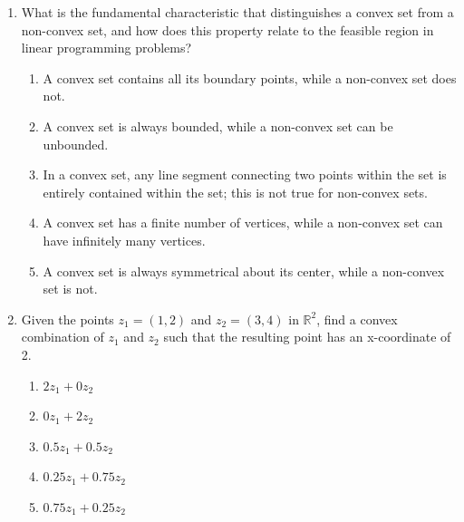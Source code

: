 \documentclass{article}%
\begin{document}
\begin{enumerate}
\vspace{1em}%
\item What is the fundamental characteristic that distinguishes a convex set from a non-convex set, and how does this property relate to the feasible region in linear programming problems?%
\begin{enumerate}%
\item A convex set contains all its boundary points, while a non-convex set does not.%
\item A convex set is always bounded, while a non-convex set can be unbounded.%
\item In a convex set, any line segment connecting two points within the set is entirely contained within the set; this is not true for non-convex sets.%
\item A convex set has a finite number of vertices, while a non-convex set can have infinitely many vertices.%
\item A convex set is always symmetrical about its center, while a non-convex set is not.%
\end{enumerate}%
\vspace{1em}%
\item Given the points $z_1 = (1, 2)$ and $z_2 = (3, 4)$ in $\mathbb{R}^2$, find a convex combination of $z_1$ and $z_2$ such that the resulting point has an x-coordinate of 2.%
\begin{enumerate}%
\item $2z_1 + 0z_2$%
\item $0z_1 + 2z_2$%
\item $0.5z_1 + 0.5z_2$%
\item $0.25z_1 + 0.75z_2$%
\item $0.75z_1 + 0.25z_2$%
\end{enumerate}%
\vspace{1em}%
\end{enumerate}

%
\newpage%
\end{document}
